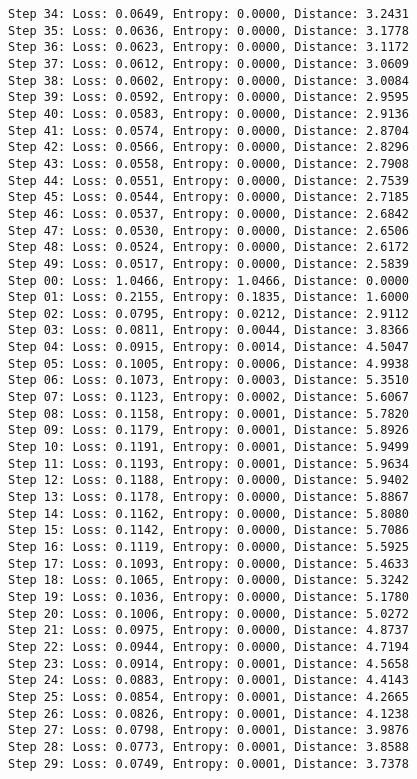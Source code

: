 \documentclass[11pt]{article}
\begin{document}
\begin{Verbatim}[commandchars=\\\{\}]
Step 34: Loss: 0.0649, Entropy: 0.0000, Distance: 3.2431
Step 35: Loss: 0.0636, Entropy: 0.0000, Distance: 3.1778
Step 36: Loss: 0.0623, Entropy: 0.0000, Distance: 3.1172
Step 37: Loss: 0.0612, Entropy: 0.0000, Distance: 3.0609
Step 38: Loss: 0.0602, Entropy: 0.0000, Distance: 3.0084
Step 39: Loss: 0.0592, Entropy: 0.0000, Distance: 2.9595
Step 40: Loss: 0.0583, Entropy: 0.0000, Distance: 2.9136
Step 41: Loss: 0.0574, Entropy: 0.0000, Distance: 2.8704
Step 42: Loss: 0.0566, Entropy: 0.0000, Distance: 2.8296
Step 43: Loss: 0.0558, Entropy: 0.0000, Distance: 2.7908
Step 44: Loss: 0.0551, Entropy: 0.0000, Distance: 2.7539
Step 45: Loss: 0.0544, Entropy: 0.0000, Distance: 2.7185
Step 46: Loss: 0.0537, Entropy: 0.0000, Distance: 2.6842
Step 47: Loss: 0.0530, Entropy: 0.0000, Distance: 2.6506
Step 48: Loss: 0.0524, Entropy: 0.0000, Distance: 2.6172
Step 49: Loss: 0.0517, Entropy: 0.0000, Distance: 2.5839
Step 00: Loss: 1.0466, Entropy: 1.0466, Distance: 0.0000
Step 01: Loss: 0.2155, Entropy: 0.1835, Distance: 1.6000
Step 02: Loss: 0.0795, Entropy: 0.0212, Distance: 2.9112
Step 03: Loss: 0.0811, Entropy: 0.0044, Distance: 3.8366
Step 04: Loss: 0.0915, Entropy: 0.0014, Distance: 4.5047
Step 05: Loss: 0.1005, Entropy: 0.0006, Distance: 4.9938
Step 06: Loss: 0.1073, Entropy: 0.0003, Distance: 5.3510
Step 07: Loss: 0.1123, Entropy: 0.0002, Distance: 5.6067
Step 08: Loss: 0.1158, Entropy: 0.0001, Distance: 5.7820
Step 09: Loss: 0.1179, Entropy: 0.0001, Distance: 5.8926
Step 10: Loss: 0.1191, Entropy: 0.0001, Distance: 5.9499
Step 11: Loss: 0.1193, Entropy: 0.0001, Distance: 5.9634
Step 12: Loss: 0.1188, Entropy: 0.0000, Distance: 5.9402
Step 13: Loss: 0.1178, Entropy: 0.0000, Distance: 5.8867
Step 14: Loss: 0.1162, Entropy: 0.0000, Distance: 5.8080
Step 15: Loss: 0.1142, Entropy: 0.0000, Distance: 5.7086
Step 16: Loss: 0.1119, Entropy: 0.0000, Distance: 5.5925
Step 17: Loss: 0.1093, Entropy: 0.0000, Distance: 5.4633
Step 18: Loss: 0.1065, Entropy: 0.0000, Distance: 5.3242
Step 19: Loss: 0.1036, Entropy: 0.0000, Distance: 5.1780
Step 20: Loss: 0.1006, Entropy: 0.0000, Distance: 5.0272
Step 21: Loss: 0.0975, Entropy: 0.0000, Distance: 4.8737
Step 22: Loss: 0.0944, Entropy: 0.0000, Distance: 4.7194
Step 23: Loss: 0.0914, Entropy: 0.0001, Distance: 4.5658
Step 24: Loss: 0.0883, Entropy: 0.0001, Distance: 4.4143
Step 25: Loss: 0.0854, Entropy: 0.0001, Distance: 4.2665
Step 26: Loss: 0.0826, Entropy: 0.0001, Distance: 4.1238
Step 27: Loss: 0.0798, Entropy: 0.0001, Distance: 3.9876
Step 28: Loss: 0.0773, Entropy: 0.0001, Distance: 3.8588
Step 29: Loss: 0.0749, Entropy: 0.0001, Distance: 3.7378

\end{Verbatim}
\end{document}

